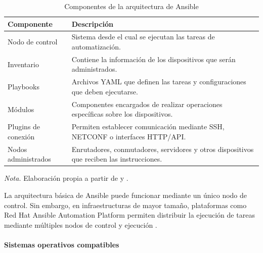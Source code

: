 \documentclass[12pt,a4paper]{article}
\begin{document}
\begin{table}[H]
    \centering
    \caption{Componentes de la arquitectura de Ansible}
    \label{tab:arquitectura_ansible}

    \begin{tabularx}{\textwidth}{p{}X}
        \toprule
        \textbf{Componente} & \textbf{Descripción} \\
        \midrule

        Nodo de control &
        Sistema desde el cual se ejecutan las tareas de
        automatización. \\

        Inventario &
        Contiene la información de los dispositivos que serán
        administrados. \\

        Playbooks &
        Archivos YAML que definen las tareas y configuraciones
        que deben ejecutarse. \\

        Módulos &
        Componentes encargados de realizar operaciones
        específicas sobre los dispositivos. \\

        Plugins de conexión &
        Permiten establecer comunicación mediante SSH,
        NETCONF o interfaces HTTP/API. \\

        Nodos administrados &
        Enrutadores, conmutadores, servidores y otros
        dispositivos que reciben las instrucciones. \\

        \bottomrule
    \end{tabularx}

    \vspace{0.2cm}

    {\footnotesize
    \textit{Nota.} Elaboración propia a partir de
    \textcite{geerling2020ansible} y
    \textcite{redhat_ansible_network}.}
\end{table}

La arquitectura básica de Ansible puede funcionar mediante
un único nodo de control. Sin embargo, en infraestructuras
de mayor tamaño, plataformas como Red Hat Ansible Automation
Platform permiten distribuir la ejecución de tareas mediante
múltiples nodos de control y ejecución
\parencite{redhat_ansible_platform}.


\paragraph{Sistemas operativos compatibles}
\end{document}

